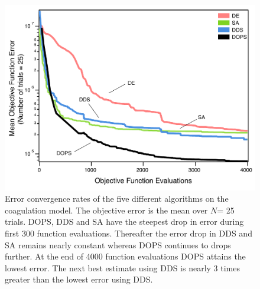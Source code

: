 \documentclass[12pt]{article}
\begin{document}
\begin{figure}[h]
\centering
\includegraphics[width=1.0\textwidth]{./figs/Figure_4_Errors_convergence_v2.pdf}
\caption{Error convergence rates of the five different algorithms on the coagulation model. The objective error is the mean over $N$= 25 trials. DOPS, DDS and SA have the steepest drop in error during first 300 function evaluations. Thereafter the error drop in DDS and SA remains nearly constant whereas DOPS continues to drops further. At the end of 4000 function evaluations DOPS attains the lowest error. The next best estimate using DDS is nearly 3 times greater than the lowest error using DDS.
}\label{fig-convergence}
\end{figure}

\clearpage
\end{document}

